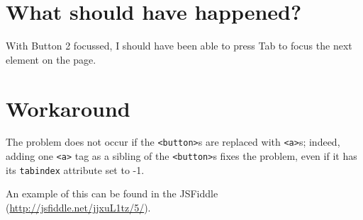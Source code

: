 \section{What should have happened?}\label{what-should-have-happened}

With Button 2 focussed, I should have been able to press Tab to focus
the next element on the page.

\section{Workaround}\label{workaround}

The problem does not occur if the
\texttt{\textless{}button\textgreater{}}s are replaced with
\texttt{\textless{}a\textgreater{}}s; indeed, adding one
\texttt{\textless{}a\textgreater{}} tag as a sibling of the
\texttt{\textless{}button\textgreater{}}s fixes the problem, even if it
has its \texttt{tabindex} attribute set to -1.

An example of this can be found in the JSFiddle
(\url{http://jsfiddle.net/jjxuL1tz/5/}).
